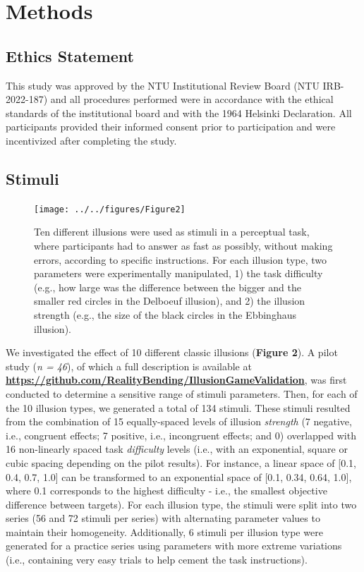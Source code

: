 \documentclass[
  man,floatsintext]{apa6}
\begin{document}
\hypertarget{methods}{%
\section{Methods}\label{methods}}

\hypertarget{ethics-statement}{%
\subsection{Ethics Statement}\label{ethics-statement}}

This study was approved by the NTU Institutional Review Board (NTU IRB-2022-187) and all procedures performed were in accordance with the ethical standards of the institutional board and with the 1964 Helsinki Declaration. All participants provided their informed consent prior to participation and were incentivized after completing the study.

\hypertarget{stimuli}{%
\subsection{Stimuli}\label{stimuli}}

\begin{figure}
\texttt{[image: ../../figures/Figure2]} \caption{Ten different illusions were used as stimuli in a perceptual task, where participants had to answer as fast as possibly, without making errors, according to specific instructions. For each illusion type, two parameters were experimentally manipulated, 1) the task difficulty (e.g., how large was the difference between the bigger and the smaller red circles in the Delboeuf illusion), and 2) the illusion strength (e.g., the size of the black circles in the Ebbinghaus illusion).}\label{fig:unnamed-chunk-3}
\end{figure}

We investigated the effect of 10 different classic illusions (\textbf{Figure 2}).
A pilot study (\emph{n = 46}), of which a full description is available at \href{https://github.com/RealityBending/IllusionGameValidation}{\textbf{https://github.com/RealityBending/IllusionGameValidation}}, was first conducted to determine a sensitive range of stimuli parameters. Then, for each of the 10 illusion types, we generated a total of 134 stimuli. These stimuli resulted from the combination of 15 equally-spaced levels of illusion \emph{strength} (7 negative, i.e., congruent effects; 7 positive, i.e., incongruent effects; and 0) overlapped with 16 non-linearly spaced task \emph{difficulty} levels (i.e., with an exponential, square or cubic spacing depending on the pilot results). For instance, a linear space of {[}0.1, 0.4, 0.7, 1.0{]} can be transformed to an exponential space of {[}0.1, 0.34, 0.64, 1.0{]}, where 0.1 corresponds to the highest difficulty - i.e., the smallest objective difference between targets). For each illusion type, the stimuli were split into two series (56 and 72 stimuli per series) with alternating parameter values to maintain their homogeneity. Additionally, 6 stimuli per illusion type were generated for a practice series using parameters with more extreme variations (i.e., containing very easy trials to help cement the task instructions).
\end{document}
